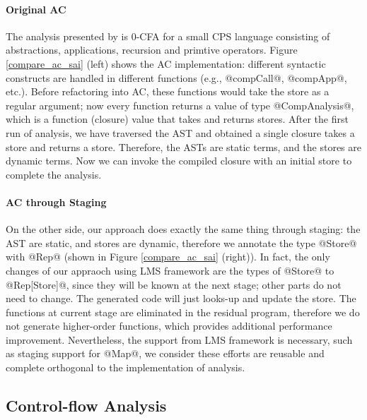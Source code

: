 \paragraph{Original AC}
The analysis presented by \citeauthor{Boucher:1996:ACN:647473.727587} is 0-CFA
for a small CPS language consisting of abstractions, applications, recursion and
primtive operators. Figure \ref{compare_ac_sai} (left) shows the AC
implementation: different syntactic constructs are handled in different functions
(e.g., @compCall@, @compApp@, etc.).
Before refactoring into AC, these functions would take the store as a
regular argument; now every function returns a value of type @CompAnalysis@,
which is a function (closure) value that takes and returns stores. After the
first run of analysis, we have traversed the AST and obtained a single closure
takes a store and returns a store. Therefore, the ASTs are static terms, and the
stores are dynamic terms. Now we can invoke the compiled closure with an initial
store to complete the analysis.

\paragraph{AC through Staging}

On the other side, our approach does exactly the same thing through staging: the
AST are static, and stores are dynamic, therefore we annotate the type @Store@
with @Rep@ (shown in Figure \ref{compare_ac_sai} (right)). In fact, the only
changes of our appraoch using LMS framework are the types of @Store@ to
@Rep[Store]@, since they will be known at the next stage; other parts do not need to change. 
The generated code
will just looks-up and update the store. The functions at current stage are
eliminated in the residual program, therefore we do not generate higher-order
functions, which provides additional performance improvement. Nevertheless,
the support from LMS framework is necessary, such as staging support for @Map@,
we consider these efforts are reusable and complete orthogonal to the
implementation of analysis.


\subsection{Control-flow Analysis} \label{cfa}

